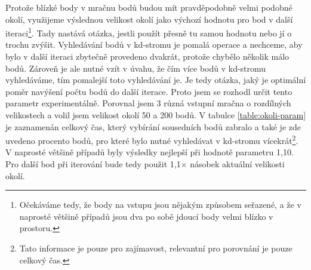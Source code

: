 \documentclass[11pt,twoside,a4paper]{book}
\begin{document}
Protože blízké body v mračnu bodů budou mít pravděpodobně velmi podobné okolí, využijeme výslednou velikost okolí jako výchozí hodnotu pro bod v další iteraci\footnote{Očekáváme tedy, že body na vstupu jsou nějakým způsobem seřazené, a že v naprosté většině případů jsou dva po sobě jdoucí body velmi blízko v prostoru.}. Tady nastává otázka, jestli použít přesně tu samou hodnotu nebo jí o trochu zvýšit. Vyhledávání bodů v kd-stromu je pomalá operace a nechceme, aby bylo v další iteraci zbytečně provedeno dvakrát, protože chybělo několik málo bodů. Zároveň je ale nutné vzít v úvahu, že čím více bodů v kd-stromu vyhledáváme, tím pomalejší toto vyhledávání je. Je tedy otázka, jaký je optimální poměr navýšení počtu bodů do další iterace. Proto jsem se rozhodl určit tento parametr experimentálně. Porovnal jsem 3 různá vstupní mračna o rozdílných velikostech a volil jsem velikost okolí 50 a 200 bodů. V tabulce \ref{table:okoli-param} je zaznamenán celkový čas, který vybírání sousedních bodů zabralo a také je zde uvedeno procento bodů, pro které bylo nutné vyhledávat v kd-stromu vícekrát\footnote{Tato informace je pouze pro zajímavost, relevantní pro porovnání je pouze celkový čas.}. V naprosté většině případů byly výsledky nejlepší při hodnotě parametru 1,10. Pro další bod při iterování bude tedy použit 1,1$\times$ násobek aktuální velikosti okolí.
\end{document}
